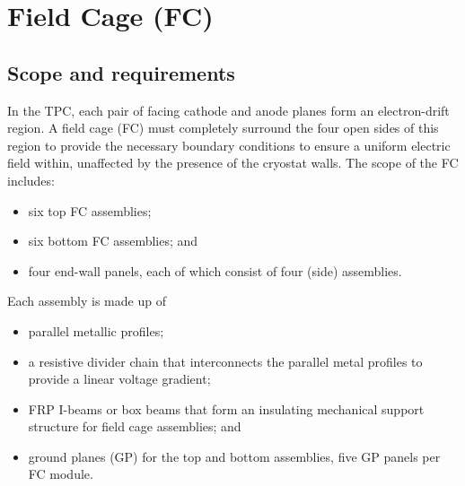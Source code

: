 



\section{Field Cage (FC)}
\label{detcompsec-fc}
\subsection{Scope and requirements} 

In the TPC, each pair of facing cathode and anode planes form an electron-drift region. A field
cage (FC) must completely surround the four open sides of this region to provide the necessary boundary
conditions to ensure a uniform electric field within, unaffected by the presence of the cryostat walls.  The scope of the FC includes:

\begin{itemize}
\item six top FC assemblies;
\item six bottom FC assemblies; and
\item four end-wall panels, each of which consist of four (side) assemblies.
\end{itemize}

Each assembly is made up of
\begin{itemize}
\item parallel metallic profiles;
\item a resistive divider chain that interconnects the parallel metal profiles  to provide a linear voltage gradient;
\item FRP I-beams or box beams that form an insulating mechanical support structure for field cage assemblies; and
\item ground planes (GP) for the top and bottom assemblies, five GP panels per FC module.
\end{itemize}

